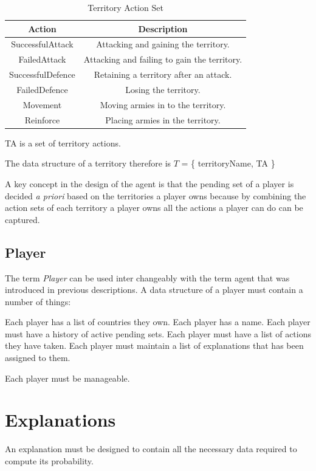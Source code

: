 \documentclass[parskip]{cs4rep}
\begin{document}
\begin{table}[ht]
\centering
\begin{tabular}{|c|c|}
\hline 
\textbf{Action} & \textbf{Description} \\ 
\hline 
SuccessfulAttack & Attacking and gaining the territory.\\ 
\hline 
FailedAttack & Attacking and failing to gain the territory.\\ 
\hline 
SuccessfulDefence & Retaining a territory after an attack.\\ 
\hline 
FailedDefence & Losing the territory.\\
\hline
Movement & Moving armies in to the territory.\\
\hline  
Reinforce & Placing armies in the territory.\\
\hline 
\end{tabular}
\caption{Territory Action Set}
\label{table:continent-bonus}
\end{table}

TA is a set of territory actions.

The data structure of a territory therefore is $T$ = \{ territoryName, TA \}

A key concept in the design of the agent is that the pending set of a player is decided \textit{a priori} based on the territories a player owns because by combining the action sets of each territory a player owns all the actions a player can do can be captured.

\subsection{Player}

The term \textit{Player} can be used inter changeably with the term agent that was introduced in previous descriptions. A data structure of a player must contain a number of things:

Each player has a list of countries they own.
Each player has a name.
Each player must have a history of active pending sets.
Each player must have a list of actions they have taken.
Each player must maintain a list of explanations that has been assigned to them.

Each player must be manageable.

\section{Explanations}

An explanation must be designed to contain all the necessary data required to compute its probability.
\end{document}
